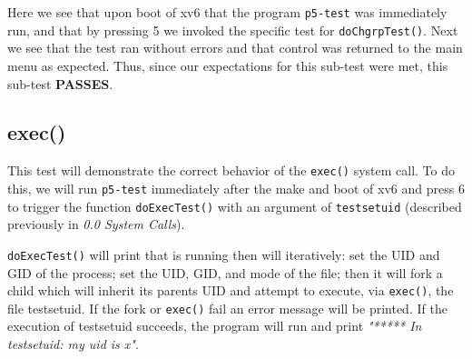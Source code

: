 \documentclass[11pt,letterpaper]{report}
\begin{document}
\pagebreak
Here we see that upon boot of xv6 that the program {\tt p5-test} was immediately run, and that by pressing 5 we invoked the specific test for  {\tt doChgrpTest()}. Next we see that the test ran without
errors and that control was returned to the main menu as expected. Thus, since our expectations for this sub-test were met, this sub-test \textbf{PASSES}.	
		
		
		\subsection{exec()}
		This test will demonstrate the correct behavior of the {\tt exec()} system call. To do this, we will run {\tt p5-test} immediately after the make and boot of xv6 
	and press 6 to trigger the function {\tt doExecTest()} with an argument of {\tt testsetuid} (described previously in \emph{0.0 System Calls}). 	
		
	{\tt doExecTest()} will print that is running then will iteratively: set the UID and GID of the process; set the UID, GID, and mode of the file; then it will fork a child which will
	inherit its parents UID and attempt to execute, 
	via {\tt exec()}, the file testsetuid. If the fork or {\tt exec()} fail an error message will be printed. If the execution of testsetuid succeeds, the program will run and print 
	\emph{"***** In testsetuid: my uid is x"}. 
	
\end{document}
